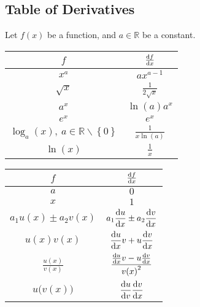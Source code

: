 \documentclass{article}
\begin{document}
\subsection{Table of Derivatives}
Let \(f(x)\) be a function, and \(a\in\mathbb{R}\) be a constant.
\begin{table}[H]
    \renewcommand*{\arraystretch}{1.5}
    \centering
    \begin{tabular}{c c}
        \toprule
        \(f\)                                                                      & \(\dv{f}{x}\)                                    \\
        \midrule
        \(x^a\)                                                                    & \(a x^{a-1}\)                                    \\
        \(\sqrt{x}\)                                                               & \(\displaystyle \frac{1}{2\sqrt{x}}\)            \\
        \(a^x\)                                                                    & \(\ln{\left(a\right)} a^x\)                      \\
        \(e^x\)                                                                   & \(e^x\)                                         \\
        \(\log_a{\left(x\right)}, \: a\in \mathbb{R}\backslash\left\{ 0 \right\}\) & \(\displaystyle \frac{1}{x\ln{\left(a\right)}}\) \\[8pt]
        \(\ln{\left(x\right)}\)                                                    & \(\displaystyle \frac{1}{x}\)                    \\[5pt]
        \bottomrule
    \end{tabular}
    \begin{tabular}{c c}
        \toprule
        \(f\)                               & \(\dv{f}{x}\)                                              \\
        \midrule
        \(a\)                               & \(0\)                                                      \\
        \(x\)                               & \(1\)                                                      \\
        \(a_1 u(x) \pm a_2 v(x)\)           & \(\displaystyle a_1\dv{u}{x} \pm a_2\dv{v}{x}\)            \\[8pt]
        \(u(x)v(x)\)                        & \(\displaystyle \dv{u}{x}v + u\dv{v}{x}\)                  \\[10pt]
        \(\displaystyle \frac{u(x)}{v(x)}\) & \(\displaystyle \frac{\dv{u}{x}v - u\dv{v}{x}}{{v(x)}^2}\) \\[8pt]
        \(u\bigl(v\left(x \right) \bigr)\)  & \(\displaystyle \dv{u}{v}\dv{v}{x}\)                       \\[5pt]
        \bottomrule
    \end{tabular}
\end{table}
\end{document}
